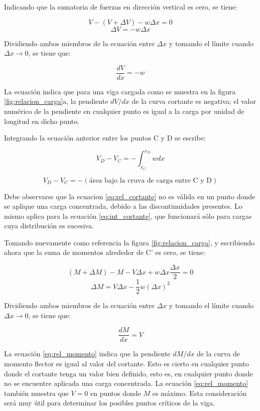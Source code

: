 \documentclass[12pt,letterpaper]{article}
\begin{document}
Indicando que la sumatoria de fuerzas en dirección vertical es cero, se tiene:

$$ V - (V+\Delta V) - w \Delta x = 0 $$
$$ \Delta V = -w \Delta x $$

Dividiendo ambos miembros de la ecuación entre $\Delta x$ y tomando el límite cuando 
$\Delta x \rightarrow 0$, se tiene que:

\begin{equation}\label{eq:rel_cortante}
\frac{dV}{dx} = -w
\end{equation}

La ecuación indica que para una viga cargada como se muestra en la figura \ref{fig:relacion_carga}a, la pendiente 
$dV/dx$ de la curva cortante es negativa; el valor numérico de la pendiente en cualquier punto es igual a la carga 
por unidad de longitud en dicho punto.

Integrando la ecuación anterior entre los puntos C y D se escribe:

\begin{equation}\label{eq:int_cortante}
V_D - V_C = - \int_{x_C}^{x_D} w dx
\end{equation}

$$ V_D - V_C = - (\text{área bajo la cruva de carga entre C y D}) $$

Debe observarse que la ecuacion \ref{eq:rel_cortante} no es válida en un punto donde se aplique 
una carga concentrada, debido a las discontinuidades presentes. Lo mismo aplica para la ecuación 
\ref{eq:int_cortante}, que funcionará sólo para cargas cuya distribución es sucesiva.

Tomando nuevamente como referencia la figura \ref{fig:relacion_carga}, y escribiendo ahora 
que la suma de momentos alrededor de C' es cero, se tiene:

$$ (M+\Delta M) - M - V \Delta x + w \Delta x \frac{\Delta x}{2} = 0 $$
$$ \Delta M = V \Delta x - \frac{1}{2} w (\Delta x)^2 $$

Dividiendo ambos miembros de la ecuación entre $\Delta x$ y tomando el límite cuando 
$\Delta x \rightarrow 0$, se tiene que:

\begin{equation}\label{eq:rel_momento}
\frac{dM}{dx} = V 
\end{equation}

La ecuación \ref{eq:rel_momento} indica que la pendiente $dM/dx$ de la curva de momento flector 
es igual al valor del cortante. Esto es cierto en cualquier punto donde el cortante 
tenga un valor bien definido, esto es, en cualquier punto donde no se encuentre  aplicada una 
carga concentrada. La ecuación \ref{eq:rel_momento} también muestra que $V=0$ en puntos donde 
$M$ es máximo. Esta consideración será muy útil para determinar los posibles puntos críticos 
de la viga.
\end{document}
